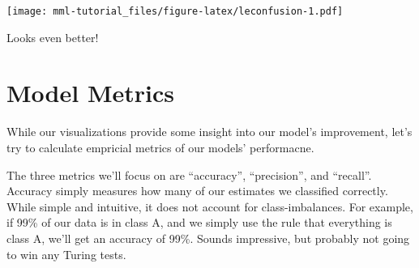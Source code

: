 \documentclass[]{book}
\newenvironment{Shaded}{\begin{snugshade}}{\end{snugshade}}
\newcommand{\KeywordTok}[1]{\textcolor[rgb]{0.13,0.29,0.53}{\textbf{#1}}}
\newcommand{\DataTypeTok}[1]{\textcolor[rgb]{0.13,0.29,0.53}{#1}}
\newcommand{\DecValTok}[1]{\textcolor[rgb]{0.00,0.00,0.81}{#1}}
\newcommand{\StringTok}[1]{\textcolor[rgb]{0.31,0.60,0.02}{#1}}
\newcommand{\OtherTok}[1]{\textcolor[rgb]{0.56,0.35,0.01}{#1}}
\newcommand{\OperatorTok}[1]{\textcolor[rgb]{0.81,0.36,0.00}{\textbf{#1}}}
\newcommand{\NormalTok}[1]{#1}
\theoremstyle{definition}
\theoremstyle{definition}
\theoremstyle{definition}
\theoremstyle{remark}
\begin{document}
\begin{Shaded}
\end{Shaded}

\texttt{[image: mml-tutorial\_files/figure-latex/leconfusion-1.pdf]}

Looks even better!

\section{Model Metrics}\label{model-metrics}

While our visualizations provide some insight into our model's
improvement, let's try to calculate empricial metrics of our models'
performacne.

The three metrics we'll focus on are ``accuracy'', ``precision'', and
``recall''. Accuracy simply measures how many of our estimates we
classified correctly. While simple and intuitive, it does not account
for class-imbalances. For example, if 99\% of our data is in class A,
and we simply use the rule that everything is class A, we'll get an
accuracy of 99\%. Sounds impressive, but probably not going to win any
Turing tests.
\end{document}
